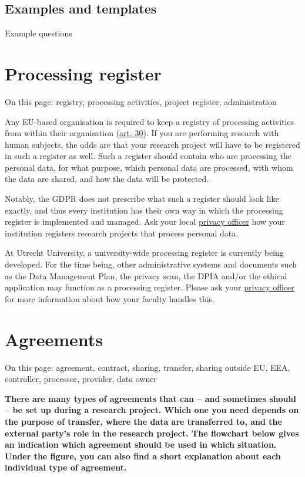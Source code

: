 \documentclass[
]{book}
\begin{document}
\hypertarget{examples-and-templates-4}{%
\subsection{Examples and templates}\label{examples-and-templates-4}}

Example questions

\hypertarget{processing-register}{%
\section{Processing register}\label{processing-register}}

On this page: registry, processing activities, project register, administration

Any EU-based organisation is required to keep a registry of processing
activities from within their organisation
(\href{https://gdpr-info.eu/art-30-gdpr/}{art. 30}).
If you are performing research with human subjects, the odds are that your
research project will have to be registered in such a register as well. Such a
register should contain who are processing the personal data, for what purpose,
which personal data are processed, with whom the data are shared, and how the
data will be protected.

Notably, the GDPR does not prescribe what such a register should look like
exactly, and thus every institution has their own way in which the processing
register is implemented and managed. Ask your local \protect\hyperlink{support}{privacy officer} how your
institution registers research projects that process personal data.

At Utrecht University, a university-wide processing register is currently being
developed. For the time being, other administrative systems and documents such as
the Data Management Plan, the privacy scan, the DPIA and/or the ethical
application may function as a processing register. Please ask your
\protect\hyperlink{support}{privacy officer} for more information about how your faculty handles this.

\hypertarget{agreements}{%
\section{Agreements}\label{agreements}}

On this page: agreement, contract, sharing, transfer, sharing outside EU, EEA,
controller, processor, provider, data owner

\textbf{There are many types of agreements that can -- and sometimes should -- be set up
during a research project. Which one you need depends on the purpose of transfer,
where the data are transferred to, and the external party's role in the research
project. The flowchart below gives an indication which agreement should be used
in which situation. Under the figure, you can also find a short explanation
about each individual type of agreement.}
\end{document}

